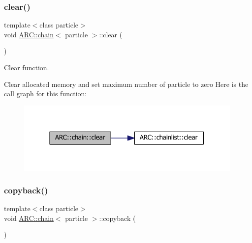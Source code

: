 \subsubsection{\texorpdfstring{clear()}{clear()}}
{\footnotesize\ttfamily template$<$class particle$>$ \\
void \hyperlink{classARC_1_1chain}{A\+R\+C\+::chain}$<$ particle $>$\+::clear (\begin{DoxyParamCaption}{ }\end{DoxyParamCaption})\hspace{0.3cm}{\ttfamily [inline]}}



Clear function. 

Clear allocated memory and set maximum number of particle to zero Here is the call graph for this function\+:
\nopagebreak
\begin{figure}[H]
\begin{center}
\leavevmode
\includegraphics[width=314pt]{classARC_1_1chain_a5299fa50788dc7e5d15504c33f76333f_cgraph}
\end{center}
\end{figure}
\hypertarget{classARC_1_1chain_a780fe41b768a5f8821ea799dae8b3d10}{}\label{classARC_1_1chain_a780fe41b768a5f8821ea799dae8b3d10} 
\subsubsection{\texorpdfstring{copyback()}{copyback()}}
{\footnotesize\ttfamily template$<$class particle$>$ \\
void \hyperlink{classARC_1_1chain}{A\+R\+C\+::chain}$<$ particle $>$\+::copyback (\begin{DoxyParamCaption}{ }\end{DoxyParamCaption})\hspace{0.3cm}{\ttfamily [inline]}}

